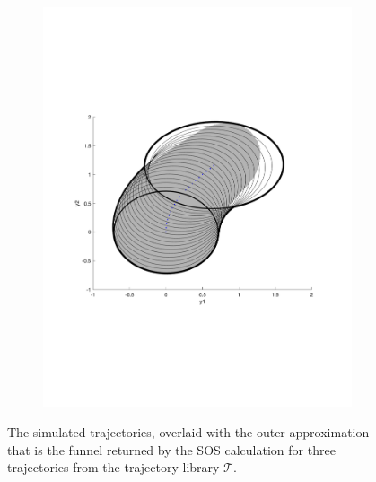 \begin{figure}
\begin{subfigure}[b]{0.3\textwidth}
    \includegraphics[width=\textwidth]{figures/experiments/FunnelSim5}
  \end{subfigure}
  \caption{The simulated trajectories, overlaid with the outer approximation
    that is the funnel returned by the \ac{SOS} calculation for three
    trajectories from the trajectory library \(\mathcal{T}\).}
  \label{fig:funnel-simulated-overlaid}
\end{figure}

